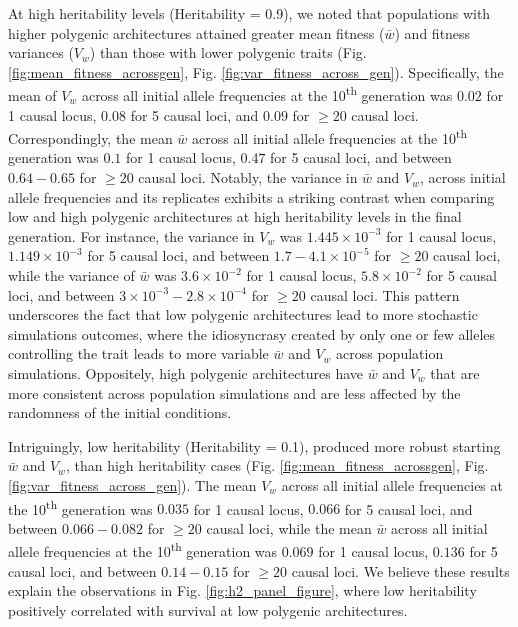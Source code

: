 \documentclass{article}
\begin{document}
At high heritability levels (Heritability = 0.9), we noted that populations with higher polygenic architectures attained greater mean fitness ($\bar{w}$) and fitness variances ($V_w$) than those with lower polygenic traits (Fig. \ref{fig:mean_fitness_acrossgen}, Fig. \ref{fig:var_fitness_across_gen}). Specifically, the mean of $V_w$ across all initial allele frequencies at the 10\textsuperscript{th} generation was $0.02$ for 1 causal locus, $0.08$  for 5 causal loci, and $0.09$  for $\geq 20$ causal loci. Correspondingly, the mean $\bar{w}$ across all initial allele frequencies at the 10\textsuperscript{th} generation was $0.1$ for 1 causal locus, $0.47$  for 5 causal loci, and between $0.64- 0.65$  for $\geq 20$ causal loci. Notably, the variance in $\bar{w}$ and $V_w$, across initial allele frequencies and its replicates exhibits a striking contrast when comparing low and high polygenic architectures at high heritability levels in the final generation. For instance, the variance in $V_w$  was $1.445 \times 10^{-3}$ for 1 causal locus, $1.149 \times 10^{-3}$ for 5 causal loci, and between $1.7-4.1 \times 10^{-5}$ for $\geq 20$ causal loci, while the variance of $\bar{w}$  was $3.6 \times 10^{-2}$ for 1 causal locus, $5.8 \times 10^{-2}$ for 5 causal loci, and between $3 \times 10^{-3} - 2.8 \times 10^{-4}$ for $\geq 20$ causal loci. This pattern underscores the fact that low polygenic architectures lead to more stochastic simulations outcomes, where the idiosyncrasy created by only one or few alleles controlling the trait leads to more variable $\bar{w}$ and $V_w$ across population simulations. Oppositely, high polygenic architectures have $\bar{w}$ and $V_w$ that are more consistent across population simulations and are less affected by the randomness of the initial conditions.

Intriguingly, low heritability (Heritability = 0.1), produced more robust starting $\bar{w}$ and $V_w$, than high heritability cases (Fig. \ref{fig:mean_fitness_acrossgen}, Fig. \ref{fig:var_fitness_across_gen}). The mean $V_w$ across all initial allele frequencies at the 10\textsuperscript{th} generation was $0.035$ for 1 causal locus, $0.066$ for 5 causal loci, and between $0.066-0.082$ for $\geq 20$ causal loci, while the mean $\bar{w}$ across all initial allele frequencies at the 10\textsuperscript{th} generation was $0.069$ for 1 causal locus, $0.136$ for 5 causal loci, and between $0.14-0.15$ for $\geq 20$ causal loci. We believe these results explain  the observations in Fig. \ref{fig:h2_panel_figure}, where low heritability positively correlated with survival at low polygenic architectures. 
\end{document}
